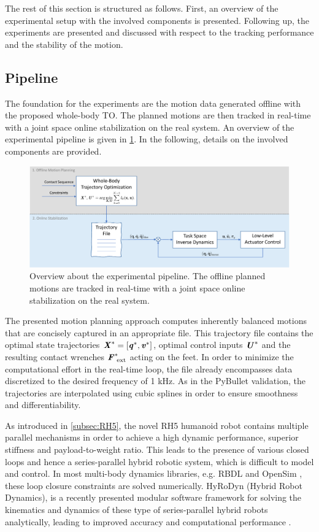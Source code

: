 The rest of this section is structured as follows. First, an overview of the experimental setup with the involved components is presented. Following up, the experiments are presented and discussed with respect to the tracking performance and the stability of the motion.

\subsection{Pipeline}\label{subsec:Pipeline}
The foundation for the experiments are the motion data generated offline with the proposed whole-body \gls{TO}. The planned motions are then tracked in real-time with a joint space online stabilization on the real system. An overview of the experimental pipeline is given in \cref{img:experimentalSetup}. In the following, details on the involved components are provided. 
\begin{figure}
\centering	
\includegraphics[width=1\textwidth]{img/experimentalSetup2}
\caption[Overview about the experimental pipeline]{Overview about the experimental pipeline. The offline planned motions are tracked in real-time with a joint space online stabilization on the real system.}
\label{img:experimentalSetup}
\end{figure}
The presented motion planning approach computes inherently balanced motions that are concisely captured in an appropriate file. This trajectory file contains the optimal state trajectories $\bm{\mathit{X}}^*=[\bm{\mathit{q}}^*,\bm{\mathit{v}}^*]$, optimal control inputs $\bm{\mathit{U}}^*$ and the resulting contact wrenches $\bm{\mathit{F}}_{\text{ ext}}^*$ acting on the feet. In order to minimize the computational effort in the real-time loop, the file already encompasses data discretized to the desired frequency of 1 kHz. As in the PyBullet validation, the trajectories are interpolated using cubic splines in order to ensure smoothness and differentiability. 

As introduced in \cref{subsec:RH5}, the novel RH5 humanoid robot contains multiple parallel mechanisms in order to achieve a high dynamic performance, superior stiffness and payload-to-weight ratio. This leads to the presence of various closed loops and hence a series-parallel hybrid robotic system, which is difficult to model and control. In most multi-body dynamics libraries, e.g. RBDL \cite{felis2017rbdl} and OpenSim \cite{delp2007opensim}, these loop closure constraints are solved numerically. HyRoDyn (Hybrid Robot Dynamics), is a recently presented modular software framework for solving the kinematics and dynamics of these type of series-parallel hybrid robots analytically, leading to improved accuracy and computational performance \cite{kumar2020analytical}.

